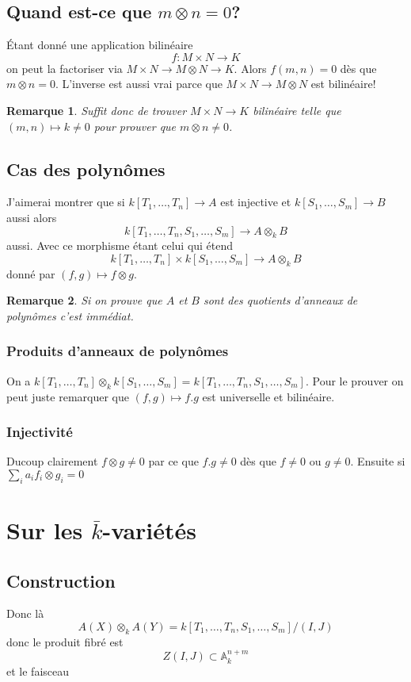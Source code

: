 \documentclass[a4paper,12pt]{book}
\newcommand{\A}{\mathbb{A}}
\theoremstyle{plain}
\newtheorem{rem}{Remarque}
\theoremstyle{definition}
\theoremstyle{remark}
\begin{document}
\section{Quand est-ce que $m\otimes n= 0$?}
Étant donné une application bilinéaire 
\[f\colon M\times N\to K\]
on peut la factoriser via $M\times N\to M\otimes N\to K$. Alors
$f(m,n)=0$ dès que $m\otimes n=0$. L'inverse est aussi vrai parce
que $M\times N\to M\otimes N$ est bilinéaire!

\begin{rem}
  Suffit donc de trouver $M\times N\to K$ bilinéaire
  telle que $(m,n)\mapsto k\ne 0$ pour prouver que 
  $m\otimes n\ne 0$.
\end{rem}
\section{Cas des polynômes}
J'aimerai montrer que si $k[T_1,\ldots, T_n]\to A$ est injective
et $k[S_1,\ldots,S_m]\to B$ aussi alors 
\[k[T_1,\ldots,T_n,S_1,\ldots,S_m]\to A\otimes_k B\]
aussi. Avec ce morphisme étant celui qui étend
\[k[T_1,\ldots,T_n]\times k[S_1,\ldots, S_m]\to A\otimes_k B\]
donné par $(f,g)\mapsto f\otimes g$. 
\begin{rem}
  Si on prouve que $A$ et $B$ sont des quotients d'anneaux de 
  polynômes c'est immédiat.
\end{rem}
\subsection{Produits d'anneaux de polynômes}
On a 
$k[T_1,\ldots, T_n]\otimes_k k[S_1,\ldots,S_m]=k[T_1,\ldots, T_n,S_1,\ldots, S_m]$.
Pour le prouver on peut juste remarquer que $(f,g)\mapsto f.g$
est universelle et bilinéaire. 

\subsection{Injectivité}
Ducoup clairement $f\otimes g\ne0$  par ce que $f.g\ne 0$ dès
que $f\ne 0$ ou $g\ne 0$. Ensuite si $\sum_i a_i f_i\otimes g_i=0$

\chapter{Sur les $\bar k$-variétés}
\section{Construction}
Donc là 
\[A(X)\otimes_k A(Y)=k[T_1,\ldots, T_n, S_1,\ldots, S_m]/(I,J)\]
donc le produit fibré est 
\[Z(I,J)\subset \A_k^{n+m}\]
et le faisceau
\end{document}
